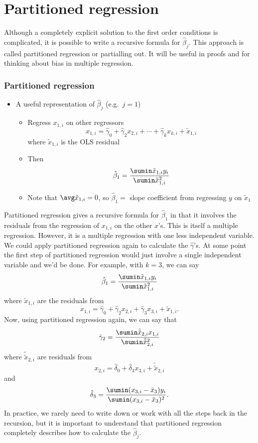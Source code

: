 \section{Partitioned regression}

Although a completely explicit solution to the first order conditions
is complicated, it is possible to write a recursive formula for
$\hat{\beta}_j$. This approach is called partitioned regression or
partialling out. It will be useful in proofs and for thinking about
bias in multiple regression.

\begin{frame}
  \frametitle{Partitioned regression}
  \begin{itemize}
  \item A useful representation of $\hat{\beta}_j$ (e.g.\ $j=1$)
    \begin{itemize}
    \item Regress $x_{1,i}$ on other regressors
      \[ x_{1,i} = \hat{\gamma}_0 + \hat{\gamma}_2 x_{2,i} + \cdots +
      \hat{\gamma}_k x_{k,i} + \tilde{x}_{1,i} \]
      where $\tilde{x}_{1,i}$ is the OLS residual
    \item Then 
      \[ \hat{\beta}_1 = \frac{\sumin \tilde{x}_{1,i} y_i}{\sumin
        \tilde{x}_{1,i}^2} \]
    \item Note that $\avg \tilde{x}_{1,i} = 0$, so $\hat{\beta}_1 = $
      slope coefficient from regressing $y$ on $\tilde{x}_1$
    \end{itemize}
  \end{itemize}

\end{frame}

Partitioned regression gives a recursive formula for $\hat{\beta}_1$
in that it involves the residuals from the regression of $x_{1,i}$ on
the other $x$'s. This is itself a multiple regression. However, it is
a multiple regression with one less independent variable. We could
apply partitioned regression again to calculate the
$\hat{\gamma}$'s. At some point the first step of
partitioned regression would just involve a single independent
variable and we'd be done. For example, with $k=3$, we can say 
\[ \hat{\beta}_1 = \frac{\sumin \tilde{x}_{1,i} y_i}{\sumin
  \tilde{x}_{1,i}^2} \]
where $\tilde{x}_{1,i}$ are the residuals from 
\[ x_{1,i} = \hat{\gamma}_0 + \hat{\gamma}_2 x_{2,i} + \hat{\gamma}_3
x_{3,i} + \tilde{x}_{1,i}. \] 
Now, using partitioned regression again, we can say that
\[ \hat{\gamma}_2 = \frac{\sumin \tilde{\tilde{x}}_{2,i} x_{1,i}}{\sumin
  \tilde{\tilde{x}}_{2,i}^2} \]
where $\tilde{\tilde{x}}_{2,i}$ are residuals from 
\[ x_{2,i} = \hat{\delta}_0 + \hat{\delta}_3 x_{3,i} +
\tilde{\tilde{x}}_{2,i} \]
and 
\[ \hat{\delta}_3 = \frac{\sumin (x_{3,i} - \bar{x}_3) y_i}{\sumin
  (x_{3,i} - \bar{x}_3)^2}. \]
In practice, we rarely need to write down or work with all the steps
back in the recursion, but it is important to understand that
partitioned regression completely describes how to calculate the
$\hat{\beta}_j$. 

